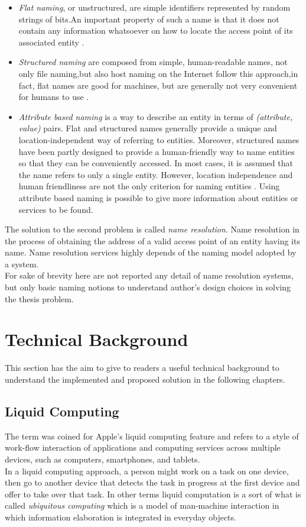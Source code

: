 \begin{itemize}
	\item \textit{Flat naming}, or unstructured, are simple identifiers represented by random strings of bits.An important property of such a name is that it does not contain any information whatsoever on how to locate the	access point of its associated entity \cite{tanenbaum2010distributed}.
	\item \textit{Structured naming} are composed from simple, human-readable names, not only file naming,but also host naming on the Internet follow this approach,in fact, flat names are good for machines, but are generally not very convenient for humans to use \cite{tanenbaum2010distributed}.
	\item \textit{Attribute based naming} is a way to describe an entity in terms of \textit{(attribute, value)}
	pairs. Flat and structured names generally provide a unique and location-independent
	way of referring to entities. Moreover, structured names have been partly
	designed to provide a human-friendly way to name entities so that they can be
	conveniently accessed. In most cases, it is assumed that the name refers to only a
	single entity. However, location independence and human friendliness are not the
	only criterion for naming entities \cite{tanenbaum2010distributed}. Using attribute based naming is possible to give more information about entities or services to be found.
\end{itemize}
The solution to the second problem is called \textit{name resolution}. Name resolution in the process of obtaining the address of a valid access point of an entity having its name. Name resolution services highly depends of the naming model adopted by a system.\\
For sake of brevity here are not reported any detail of name resolution systems, but only basic naming notions to understand author's design choices in solving the thesis problem. 


\section{Technical Background}\label{techback}
This section has the aim to give to readers a useful technical background to understand the implemented and proposed solution in the following chapters.
\subsection{Liquid Computing}\label{liquid computing}
The term was coined for Apple's liquid computing feature and  refers to a style of work-flow interaction of applications and computing services across multiple devices, such as computers, smartphones, and tablets.\\
In a liquid computing approach, a person might work on a task on one device, then go to another device that detects the task in progress at the first device and offer to take over that task.
In other terms liquid computation is a sort of what is called \textit{ubiquitous computing} which is a model of man-machine interaction in which information elaboration is integrated in everyday objects.
